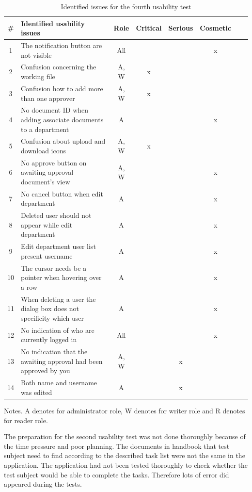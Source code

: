 \begin{table}[H]
	\begin{center}
	\begin{tabular}{| c | m{15em} | c | c | c | c | c | c |}
		\hline
		\# & \textbf{Identified usability issues} & Role & Critical & Serious & Cosmetic \\
		\hline
		 1 & The notification button are not visible & All & & & x \\
		\hline
		 2 & Confusion concerning the working file & A, W & x & & \\
		\hline
		 3 & Confusion how to add more than one approver & A, W & x & & \\
		\hline
		4 & No document ID when adding associate documents to a department & A & & & x\\
		\hline
		5 &  Confusion about upload and download icons & A, W & x &  &\\
		\hline
		6 & No approve button on awaiting approval document's view & A, W &  & & x\\
		\hline
		7 & No cancel button when edit department & A & & & x\\
		\hline
		8 & Deleted user should not appear while edit department & A & & & x \\
		\hline
		9 & Edit department user list present username & A &  & & x \\
		\hline
		10 & The cursor needs be a pointer when hovering over a row & A &  &  & x \\
		\hline
		11 & When deleting a user the dialog box  does not specificity which user & A & & & x\\
		\hline
		12 & No indication of who are currently logged in & All & & & x \\
		\hline
		13 & No indication that the awaiting approval had been approved by you & A, W & & x & \\
		\hline
		14 & Both name and username was edited & A & & x & \\
		\hline
	\end{tabular}
	\end{center}
	 {\raggedright Notes. A denotes for administrator role, W denotes for writer role and R denotes for reader role.\par}
	\caption{Identified issues for the fourth usability test}\label{tab:utest4}
\end{table}

The preparation for the second usability test was not done thoroughly because of the time pressure and poor planning. 
The documents in handbook that test subject need to find according to the  described task list were not the same in the application. 
The application had not been tested thoroughly to check whether the test subject would be able to complete the tasks.
Therefore lots of error did appeared during the tests.  

